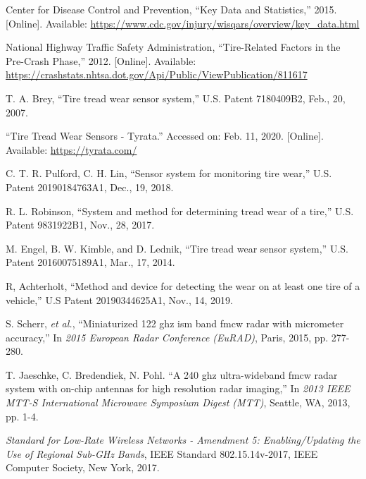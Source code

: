 \documentclass[11pt]{IEEEtran}
\begin{document}
	\begin{thebibliography}{00}
		 Center for Disease Control and Prevention, ``Key Data and Statistics,'' 2015. [Online]. Available: \url{https://www.cdc.gov/injury/wisqars/overview/key_data.html}

		 National Highway Traffic Safety Administration, ``Tire-Related Factors in the Pre-Crash Phase,'' 2012. [Online]. Available: \url{https://crashstats.nhtsa.dot.gov/Api/Public/ViewPublication/811617}


		
		 T. A. Brey, ``Tire tread wear sensor system,'' U.S. Patent 7180409B2, Feb., 20, 2007.
		
		 ``Tire Tread Wear Sensors - Tyrata.'' Accessed on: Feb. 11, 2020. [Online]. Available: \url{https://tyrata.com/}
		
		 C. T. R. Pulford, C. H. Lin, ``Sensor system for monitoring tire wear,'' U.S. Patent 20190184763A1, Dec., 19, 2018.
		
		 R. L. Robinson, ``System and method for determining tread wear of a tire,'' U.S. Patent 9831922B1, Nov., 28, 2017.
		
		 M. Engel, B. W. Kimble, and D. Lednik, ``Tire tread wear sensor system,'' U.S. Patent 20160075189A1, Mar., 17, 2014.
		
		 R, Achterholt, ``Method and device for detecting the wear on at least one tire of a vehicle,'' U.S Patent 20190344625A1, Nov., 14, 2019.

		 S. Scherr, \textit{et al.}, ``Miniaturized 122 ghz ism band fmcw radar with micrometer accuracy,'' In \textit{2015 European Radar Conference (EuRAD)}, Paris, 2015, pp. 277-280.

		 T. Jaeschke, C. Bredendiek, N. Pohl. ``A 240 ghz ultra-wideband fmcw radar system with on-chip antennas for high resolution radar imaging,'' In \textit{2013 IEEE MTT-S International Microwave Symposium Digest (MTT)}, Seattle, WA, 2013, pp. 1-4.
    	

    	 \textit{Standard for Low-Rate Wireless Networks - Amendment 5: Enabling/Updating the Use of Regional Sub-GHz Bands}, IEEE Standard 802.15.14v-2017, IEEE Computer Society, New York, 2017.
		

\end{thebibliography}
\end{document}
